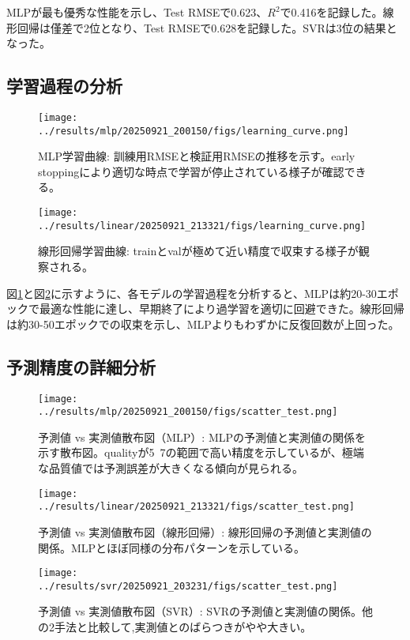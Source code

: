 \documentclass[12pt,a4paper,dvipdfmx]{jsarticle}
\begin{document}
MLPが最も優秀な性能を示し、Test RMSEで0.623、$R^2$で0.416を記録した。線形回帰は僅差で2位となり、Test RMSEで0.628を記録した。SVRは3位の結果となった。

\subsection{学習過程の分析}

\begin{figure}[H]
\centering
\texttt{[image: ../results/mlp/20250921\_200150/figs/learning\_curve.png]}
\caption{MLP学習曲線: 訓練用RMSEと検証用RMSEの推移を示す。early stoppingにより適切な時点で学習が停止されている様子が確認できる。}
\label{fig:mlp_learning}
\end{figure}

\begin{figure}[H]
\centering
\texttt{[image: ../results/linear/20250921\_213321/figs/learning\_curve.png]}
\caption{線形回帰学習曲線: trainとvalが極めて近い精度で収束する様子が観察される。}
\label{fig:linear_learning}
\end{figure}

図\ref{fig:mlp_learning}と図\ref{fig:linear_learning}に示すように、各モデルの学習過程を分析すると、MLPは約20-30エポックで最適な性能に達し、早期終了により過学習を適切に回避できた。線形回帰は約30-50エポックでの収束を示し、MLPよりもわずかに反復回数が上回った。

\subsection{予測精度の詳細分析}

\begin{figure}[H]
\centering
\texttt{[image: ../results/mlp/20250921\_200150/figs/scatter\_test.png]}
\caption{予測値 vs 実測値散布図（MLP）: MLPの予測値と実測値の関係を示す散布図。qualityが5~7の範囲で高い精度を示しているが、極端な品質値では予測誤差が大きくなる傾向が見られる。}
\label{fig:mlp_scatter}
\end{figure}

\begin{figure}[H]
\centering
\texttt{[image: ../results/linear/20250921\_213321/figs/scatter\_test.png]}
\caption{予測値 vs 実測値散布図（線形回帰）: 線形回帰の予測値と実測値の関係。MLPとほぼ同様の分布パターンを示している。}
\label{fig:linear_scatter}
\end{figure}

\begin{figure}[H]
\centering
\texttt{[image: ../results/svr/20250921\_203231/figs/scatter\_test.png]}
\caption{予測値 vs 実測値散布図（SVR）: SVRの予測値と実測値の関係。他の2手法と比較して,実測値とのばらつきがやや大きい。}
\label{fig:svr_scatter}
\end{figure}
\end{document}
